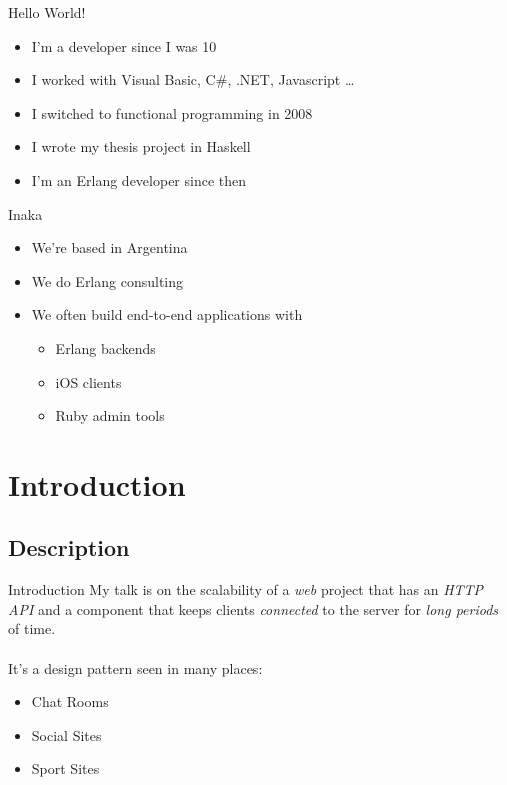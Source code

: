 \documentclass[utf8,hyperref={colorlinks=true}]{beamer}
\begin{document}

\frame{\titlepage} 

\begin{frame}{Hello World!}
	\begin{itemize}
		\item<+-> I'm a developer since I was 10
		\item<+-> I worked with Visual Basic, C\#, .NET, Javascript \ldots
		\item<+-> I switched to functional programming in 2008
		\item<+-> I wrote my thesis project in Haskell
		\item<+-> I'm an Erlang developer since then
	\end{itemize}
\end{frame}
\begin{frame}{Inaka}
	\begin{itemize}
		\item We're based in Argentina
		\item We do Erlang consulting
		\item We often build end-to-end applications with
			\begin{itemize}
				\item Erlang backends
				\item iOS clients
				\item Ruby admin tools
			\end{itemize}
	\end{itemize}
\end{frame}

\section{Introduction}
\subsection{Description}
\begin{frame}{Introduction}
	My talk is on the scalability of a \emph{web} project \pause that has an \emph{HTTP API} \pause and a component that keeps clients \emph{connected} to the server for \emph{long periods} of time.\\ ~ \\ \pause
	It's a design pattern seen in many places:
	\begin{itemize}
		\item Chat Rooms
		\item Social Sites
		\item Sport Sites
	\end{itemize}
\end{frame}
\end{document}

